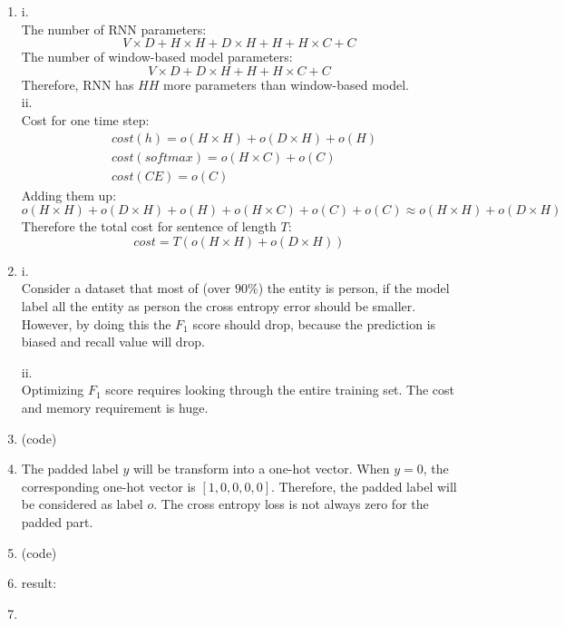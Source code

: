 \documentclass[10pt]{article}
\begin{document}
\begin{enumerate}[label=(\alph*)]
\item
i.\\
The number of RNN parameters:
$$
V \times D + H \times H + D \times H + H + H \times C + C
$$
The number of window-based model parameters:
$$
V \times D + D \times H + H + H \times C + C
$$
Therefore, RNN has $HH$ more parameters than window-based model.\\

ii.\\
Cost for one time step:
$$
\begin{aligned}
& cost(h) = o(H \times H) + o(D \times H) + o(H)\\
& cost(softmax) = o(H \times C) + o(C)\\
& cost(CE) = o(C)
\end{aligned}
$$
Adding them up:
$$
o(H \times H) + o(D \times H) + o(H) + o(H \times C) + o(C) + o(C) \approx o(H \times H) + o(D \times H)
$$
Therefore the total cost for sentence of length $T$:
$$
cost = T(o(H \times H) + o(D \times H))
$$

\item
i.\\
Consider a dataset that most of (over $90\%$) the entity is person,
if the model label all the entity as person the cross entropy error should be smaller.
However, by doing this the $F_1$ score should drop, because the prediction is biased and recall value will drop.

ii.\\
Optimizing $F_1$ score requires looking through the entire training set. The cost and memory requirement is huge.

\item
(code)

\item
The padded label $y$ will be transform into a one-hot vector.
When $y=0$, the corresponding one-hot vector is $[1, 0, 0, 0, 0]$.
Therefore, the padded label will be considered as label $o$.
The cross entropy loss is not always zero for the padded part.

\item
(code)

\item
result:

\item

\end{enumerate}
\end{document}
